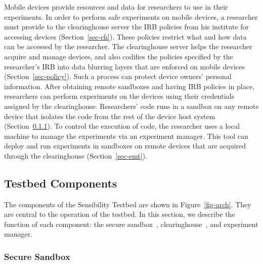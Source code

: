 Mobile devices
provide resources and data for researchers to use in their
experiments. In order to perform safe experiments on mobile
devices, a researcher must provide to the clearinghouse server
the IRB policies from his institute for accessing devices 
(Section~\ref{sec-ch}).  These 
policies restrict what and how data can be accessed by the 
researcher. The
clearinghouse server helps the researcher acquire and manage
devices, and also codifies the policies specified by the
researcher's IRB into data blurring layers that are enforced on
mobile devices (Section~\ref{sec-policy}). Such a process can protect device
owners' personal information. After obtaining remote sandboxes
and having IRB policies in place, researchers can perform
experiments on the devices using their credentials assigned by
the clearinghouse. Researchers' code runs in a sandbox on any
remote device that isolates the code from the rest of the device
host system (Section~\ref{sec-repy}). To control the execution of 
code, the researcher uses a local machine to manage the 
experiments via an experiment manager. This tool can deploy 
and run experiments in sandboxes on remote devices that are 
acquired through the clearinghouse (Section~\ref{sec-emt}).



\subsection{Testbed Components}\label{sec-component}

The components of the Sensibility Testbed are shown in Figure~\ref{fig-arch}.
They are central to the operation of the testbed. 
In this section, we describe the function of each component: the
secure sandbox~\cite{cappos2010retaining}, clearinghouse~\cite{ch}, 
and experiment manager.

\subsubsection{Secure Sandbox}\label{sec-repy}

